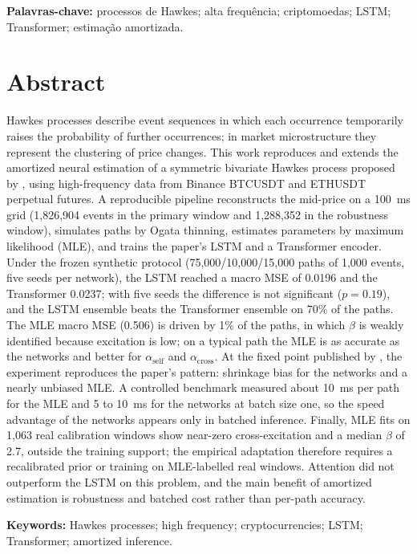 \documentclass[12pt,a4paper,openany]{report}
\begin{document}
\noindent\textbf{Palavras-chave:} processos de Hawkes; alta frequência; criptomoedas;
LSTM; Transformer; estimação amortizada.

\chapter*{Abstract}

Hawkes processes describe event sequences in which each occurrence temporarily raises
the probability of further occurrences; in market microstructure they represent the
clustering of price changes. This work reproduces and extends the amortized neural
estimation of a symmetric bivariate Hawkes process proposed by \citet{lee2023}, using
high-frequency data from Binance BTCUSDT and ETHUSDT perpetual futures. A reproducible
pipeline reconstructs the mid-price on a 100~ms grid (1,826,904 events in the primary
window and 1,288,352 in the robustness window), simulates paths by Ogata thinning,
estimates parameters by maximum likelihood (MLE), and trains the paper's LSTM and a
Transformer encoder. Under the frozen synthetic protocol (75,000/10,000/15,000 paths
of 1,000 events, five seeds per network), the LSTM reached a macro MSE of 0.0196 and
the Transformer 0.0237; with five seeds the difference is not significant ($p=0.19$),
and the LSTM ensemble beats the Transformer ensemble on 70\% of the paths. The MLE
macro MSE (0.506) is driven by 1\% of the paths, in which $\beta$ is weakly identified
because excitation is low; on a typical path the MLE is as accurate as the networks
and better for $\alpha_{\mathrm{self}}$ and $\alpha_{\mathrm{cross}}$. At the fixed
point published by \citet{lee2023}, the experiment reproduces the paper's pattern:
shrinkage bias for the networks and a nearly unbiased MLE. A controlled benchmark
measured about 10~ms per path for the MLE and 5 to 10~ms for the networks at batch
size one, so the speed advantage of the networks appears only in batched inference.
Finally, MLE fits on 1,063 real calibration windows show near-zero cross-excitation
and a median $\beta$ of 2.7, outside the training support; the empirical adaptation
therefore requires a recalibrated prior or training on MLE-labelled real windows.
Attention did not outperform the LSTM on this problem, and the main benefit of
amortized estimation is robustness and batched cost rather than per-path accuracy.

\noindent\textbf{Keywords:} Hawkes processes; high frequency; cryptocurrencies; LSTM;
Transformer; amortized inference.
\end{document}
